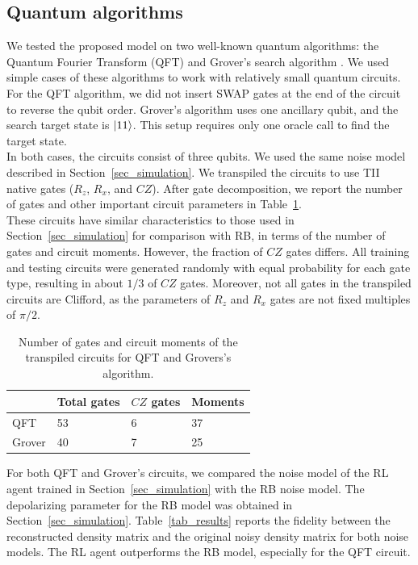 \documentclass[referee,sn-basic]{sn-jnl} %
\begin{document}
\subsection{Quantum algorithms}
We tested the proposed model on two well-known quantum algorithms: the Quantum Fourier Transform (QFT) 
\cite{Shor_1997} and Grover's search algorithm \cite{grover1996fast}. We used simple cases of these 
algorithms to work with relatively small quantum circuits.\\
For the QFT algorithm, we did not insert SWAP gates at the end of the circuit to reverse the qubit order. 
Grover's algorithm uses one ancillary qubit, and the search target state is $\ket{11}$. This setup requires only 
one oracle call to find the target state.\\
In both cases, the circuits consist of three qubits. We used the same noise model described in 
Section~\ref{sec_simulation}. We transpiled the circuits to use TII native gates ($R_z$, $R_x$, and $CZ$). 
After gate decomposition, we report the number of gates and other important circuit parameters in 
Table~\ref{tab_gates}.\\
These circuits have similar characteristics to those used in Section~\ref{sec_simulation} for comparison 
with RB, in terms of the number of gates and circuit moments. However, the fraction of $CZ$ gates differs. 
All training and testing circuits were generated randomly with equal probability for each gate type, 
resulting in about $1/3$ of $CZ$ gates.
Moreover, not all gates in the transpiled circuits are Clifford, as the parameters of $R_z$ and $R_x$ gates 
are not fixed multiples of $\pi/2$.

\begin{table}[ht]
\centering
\caption{Number of gates and circuit moments of the transpiled circuits for QFT and Grovers's algorithm.}
\label{tab_gates}
\begin{tabular}{@{}llll@{}}
\toprule
& Total gates & $CZ$ gates & Moments \\
\midrule
QFT & 53 & 6 & 37 \\
Grover & 40 & 7 & 25 \\
\bottomrule
\end{tabular}
\end{table}

\noindent
For both QFT and Grover's circuits, we compared the noise model of the RL agent trained in 
Section~\ref{sec_simulation} with the RB noise model. The depolarizing parameter for the RB model was 
obtained in Section~\ref{sec_simulation}. 
Table~\ref{tab_results} reports the fidelity between the reconstructed density matrix and the original 
noisy density matrix for both noise models. The RL agent outperforms the RB model, especially for the QFT 
circuit.
\end{document}

